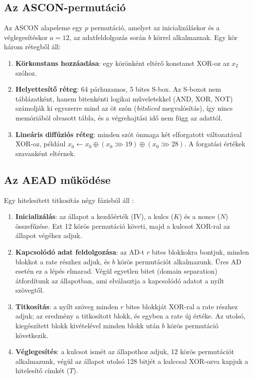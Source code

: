 \documentclass[a4paper,12pt]{report}
\theoremstyle{definition}
\theoremstyle{remark}
\begin{document}
\subsection{Az ASCON-permutáció}\label{sec:ascon_perm}

Az ASCON alapeleme egy $p$ permutáció, amelyet az inicializáláskor és a véglegesítéskor $a = 12$, az adatfeldolgozás során $b$ körrel alkalmaznak. Egy kör három rétegből áll:

\begin{enumerate}
	\item \textbf{Körkonstans hozzáadása}: egy körönként eltérő konstanst XOR-oz az $x_2$ szóhoz.
	\item \textbf{Helyettesítő réteg}: 64 párhuzamos, 5 bites S-box. Az S-boxot nem táblázatként, hanem bitenkénti logikai műveletekkel (AND, XOR, NOT) számolják ki egyszerre mind az öt szón (\emph{bitsliced} megvalósítás), így nincs memóriából olvasott tábla, és a végrehajtási idő nem függ az adattól.
	\item \textbf{Lineáris diffúziós réteg}: minden szót önmaga két elforgatott változatával XOR-oz, például $x_0 \leftarrow x_0 \oplus (x_0 \ggg 19) \oplus (x_0 \ggg 28)$. A forgatási értékek szavanként eltérnek.
\end{enumerate}

\subsection{Az AEAD működése}\label{sec:ascon_aead}

Egy hitelesített titkosítás négy fázisból áll \cite{Dobraunig2021}:

\begin{enumerate}
	\item \textbf{Inicializálás}: az állapot a kezdőérték (IV), a kulcs ($K$) és a nonce ($N$) összefűzése. Ezt 12 körös permutáció követi, majd a kulcsot XOR-ral az állapot végéhez adjuk.
	\item \textbf{Kapcsolódó adat feldolgozása}: az AD-t $r$ bites blokkokra bontjuk, minden blokkot a rate részhez adjuk, és $b$ körös permutációt alkalmazunk. Üres AD esetén ez a lépés elmarad. Végül egyetlen bitet (domain separation) átfordítunk az állapotban, ami elválasztja a kapcsolódó adatot a nyílt szövegtől.
	\item \textbf{Titkosítás}: a nyílt szöveg minden $r$ bites blokkját XOR-ral a rate részhez adjuk; az eredmény a titkosított blokk, és egyben a rate új értéke. Az utolsó, kiegészített blokk kivételével minden blokk után $b$ körös permutáció következik.
	\item \textbf{Véglegesítés}: a kulcsot ismét az állapothoz adjuk, 12 körös permutációt alkalmazunk, végül az állapot utolsó 128 bitjét a kulccsal XOR-ozva kapjuk a hitelesítő címkét ($T$).
\end{enumerate}
\end{document}
